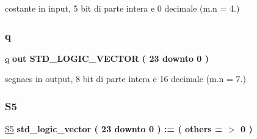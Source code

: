 costante in input, 5 bit di parte intera e 0 decimale (m.\+n = 4.) 

\mbox{\label{group___linear_regression_gacec4f4b6d139d1ada088ca2d3d881418}} 
\subsubsection{\texorpdfstring{q}{q}}
{\footnotesize\ttfamily \hyperlink{group___linear_regression_gacec4f4b6d139d1ada088ca2d3d881418}{q} {\bfseries \textcolor{vhdlchar}{out}\textcolor{vhdlchar}{ }} {\bfseries \textcolor{vhdlchar}{S\+T\+D\+\_\+\+L\+O\+G\+I\+C\+\_\+\+V\+E\+C\+T\+OR}\textcolor{vhdlchar}{ }\textcolor{vhdlchar}{(}\textcolor{vhdlchar}{ }\textcolor{vhdlchar}{ } \textcolor{vhdldigit}{23} \textcolor{vhdlchar}{ }\textcolor{vhdlchar}{downto}\textcolor{vhdlchar}{ }\textcolor{vhdlchar}{ } \textcolor{vhdldigit}{0} \textcolor{vhdlchar}{ }\textcolor{vhdlchar}{)}\textcolor{vhdlchar}{ }} \hspace{0.3cm}{\ttfamily [Port]}}



segnaes in output, 8 bit di parte intera e 16 decimale (m.\+n = 7.) 

\mbox{\label{group___linear_regression_gaf847f35901bdae7b10eff5f0576735ec}} 
\subsubsection{\texorpdfstring{S5}{S5}}
{\footnotesize\ttfamily \hyperlink{group___linear_regression_gaf847f35901bdae7b10eff5f0576735ec}{S5} {\bfseries \textcolor{vhdlchar}{std\+\_\+logic\+\_\+vector}\textcolor{vhdlchar}{ }\textcolor{vhdlchar}{(}\textcolor{vhdlchar}{ }\textcolor{vhdlchar}{ } \textcolor{vhdldigit}{23} \textcolor{vhdlchar}{ }\textcolor{vhdlchar}{downto}\textcolor{vhdlchar}{ }\textcolor{vhdlchar}{ } \textcolor{vhdldigit}{0} \textcolor{vhdlchar}{ }\textcolor{vhdlchar}{)}\textcolor{vhdlchar}{ }\textcolor{vhdlchar}{ }\textcolor{vhdlchar}{ }\textcolor{vhdlchar}{\+:}\textcolor{vhdlchar}{=}\textcolor{vhdlchar}{ }\textcolor{vhdlchar}{(}\textcolor{vhdlchar}{ }\textcolor{vhdlchar}{ }\textcolor{vhdlchar}{others}\textcolor{vhdlchar}{ }\textcolor{vhdlchar}{ }\textcolor{vhdlchar}{=}\textcolor{vhdlchar}{ }\textcolor{vhdlchar}{$>$}\textcolor{vhdlchar}{ }\textcolor{vhdlchar}{\textquotesingle{}}\textcolor{vhdlchar}{ } \textcolor{vhdldigit}{0} \textcolor{vhdlchar}{ }\textcolor{vhdlchar}{\textquotesingle{}}\textcolor{vhdlchar}{ }\textcolor{vhdlchar}{)}\textcolor{vhdlchar}{ }} \hspace{0.3cm}{\ttfamily [Signal]}}

